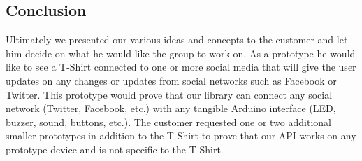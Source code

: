 \subsection{Conclusion}
Ultimately we presented our various ideas and concepts to the customer and let him decide on what he would
like the group to work on. As a prototype he would like to see a T-Shirt connected to one or more social media
that will give the user updates on any changes or updates from social networks such as Facebook or Twitter.
This prototype would prove that our library can connect any social network (Twitter, Facebook, etc.) with any
tangible Arduino interface (LED, buzzer, sound, buttons, etc.). The customer requested one or two additional
smaller prototypes in addition to the T-Shirt to prove that our API works on any prototype device and is not
specific to the T-Shirt.
